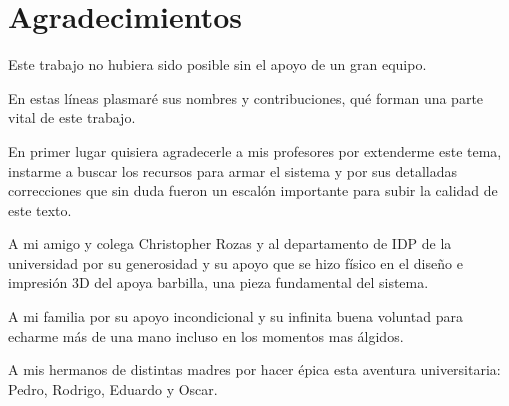 \documentclass[\main/Main.tex]{subfiles}
\begin{document}
\chapter{Agradecimientos}
	Este trabajo no hubiera sido posible sin el apoyo de un gran equipo.
	
	En estas líneas plasmaré sus nombres y contribuciones, qué forman una parte vital de este trabajo. 

	En primer lugar quisiera agradecerle a mis profesores por extenderme este tema, instarme a buscar los recursos para armar el sistema y por sus detalladas correcciones que sin duda fueron un escalón importante para subir la calidad de este texto.
	
	A mi amigo y colega Christopher Rozas y al departamento de IDP de la universidad por su generosidad y su apoyo que se hizo físico en el diseño e impresión 3D del apoya barbilla, una pieza fundamental del sistema.
	
	A mi familia por su apoyo incondicional y su infinita buena voluntad para echarme más de una mano incluso en los momentos mas álgidos.  

	A mis hermanos de distintas madres por hacer épica esta aventura universitaria: Pedro, Rodrigo, Eduardo y Oscar.
\end{document}
